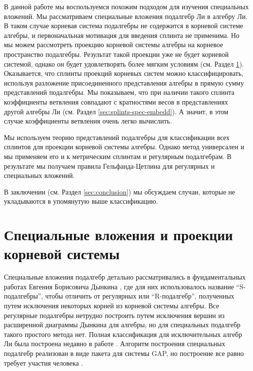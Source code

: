 \documentclass[12pt]{article}
\begin{document}
В данной работе мы воспользуемся похожим подходом для изучения специальных вложений. Мы
рассматриваем специальные вложения подалгебр Ли в алгебру Ли. В таком случае корневая система
подалгебры не содержится в корневой системе алгебры, и первоначальная мотивация для введения сплинта
не применима. Но мы можем рассмотреть проекцию корневой системы алгебры на корневое пространство
подалгебры. Результат такой проекции уже не будет корневой системой, однако он будет удовлетворять
более мягким условиям (см. Раздел \ref{sec:spec-embedd-proj}). Оказывается, что сплинты проекций
корневых систем можно классифицировать, используя разложение присоединенного представления алгебры
в прямую сумму представлений подалгебры. Мы показываем, что при наличии такого сплинта коэффициенты
ветвления совпадают с кратностями весов в представлениях другой алгебры Ли (см. Раздел
\ref{sec:splints-spec-embedd}). А значит, в этом случае коэффициенты ветвления очень легко вычислить.

Мы используем теорию представлений подалгебры для классификации всех сплинтов для проекции корневой
системы алгебры. Однако метод универсален и мы применяем его и к метрическим сплинтам и регулярным
подалгебрам. В результате мы получаем правила Гельфанда-Цетлина для регулярных и специальных
вложений. 

В заключении (см. Раздел \ref{sec:conclusion}) мы обсуждаем случаи, которые не укладываются в упомянутую выше
классификацию.


\section{Специальные вложения и проекции корневой системы}
\label{sec:spec-embedd-proj}

Специальные вложения подалгебр детально рассматривались в фундаментальных работах Евгения Борисовича Дынкина \cite{dynkin1952semisimpleru,dynkin1952maximalru}, где для них использовалось
название ``S-подалгебры'', чтобы отличить от регулярных или ``R-подалгебр'', полученных путем
исключения некоторых корней из корневой системы алгебры. Все регулярные подалгебры нетрудно построить
путем исключения вершин из расширенной диаграммы Дынкина для алгебры, но для специальных подалгебр
такого простого метода нет. Полная классификация для исключительных алгебр Ли была построена недавно
в работе \cite{minchenko2006semisimple}. Алгоритм построения специальных подалгебр реализован в виде
пакета для системы GAP, но построение все равно требует участия человека \cite{de2011constructing}.  
\end{document}

